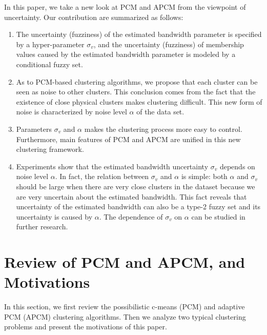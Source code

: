 \documentclass[journal]{IEEEtran}
\theoremstyle{definition}
\begin{document}
In this paper, we take a new look at PCM and APCM from the viewpoint of uncertainty.
Our contribution are summarized as follows:
\begin{enumerate}
\item The uncertainty (fuzziness) of the estimated bandwidth parameter is specified by a hyper-parameter $\sigma_v$, and the uncertainty (fuzziness) of membership values caused by the estimated bandwidth parameter is modeled by a conditional fuzzy set.
\item As to PCM-based clustering algorithms, we propose that each cluster can be seen as noise to other clusters. This conclusion comes from the fact that the existence of close physical clusters makes clustering difficult. This new form of noise is characterized by noise level $\alpha$ of the data set.
\item Parameters $\sigma_v$ and $\alpha$ makes the clustering process more easy to control. Furthermore, main features of PCM and APCM are unified in this new clustering framework.
\item Experiments show that the estimated bandwidth uncertainty $\sigma_v$ depends on noise level $\alpha$. In fact, the relation between $\sigma_v$ and $\alpha$ is simple: both $\alpha$ and $\sigma_v$ should be large when there are very close clusters in the dataset because we are very uncertain about the estimated bandwidth. This fact reveals that uncertainty of the estimated bandwidth can also be a type-2 fuzzy set and its uncertainty is caused by $\alpha$. The dependence of $\sigma_v$ on $\alpha$ can be studied in further research.
\end{enumerate}

\section{Review of PCM and APCM, and Motivations}
\label{sec-2}
In this section, we first review the possibilistic c-means (PCM) and adaptive PCM (APCM) clustering algorithms. Then we analyze two typical clustering problems and present the motivations of this paper.
\end{document}
